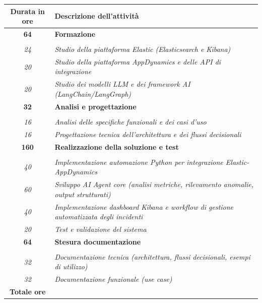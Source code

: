 

\begin{tabularx}{\textwidth}{|c|X|}
	\hline
	\textbf{Durata in ore} & \textbf{Descrizione dell'attività} \\\hline

	\textbf{64} & \textbf{Formazione} \\ \hdashline
    \multirow{3}{0cm}\\
    \textit{24} & \textit{Studio della piattaforma Elastic (Elasticsearch e Kibana)} \\
    \textit{20} & \textit{Studio della piattaforma AppDynamics e delle API di integrazione} \\
    \textit{20} & \textit{Studio dei modelli LLM e dei framework AI (LangChain/LangGraph)} \\
    \hline

    \textbf{32} & \textbf{Analisi e progettazione} \\ \hdashline
    \multirow{2}{0cm}\\
    \textit{16} & \textit{Analisi delle specifiche funzionali e dei casi d'uso} \\
    \textit{16} & \textit{Progettazione tecnica dell'architettura e dei flussi decisionali} \\
    \hline

    \textbf{160} & \textbf{Realizzazione della soluzione e test} \\ \hdashline
    \multirow{4}{0cm}\\
    \textit{40} & \textit{Implementazione automazione Python per integrazione Elastic-AppDynamics} \\
    \textit{60} & \textit{Sviluppo AI Agent core (analisi metriche, rilevamento anomalie, output strutturati)} \\
    \textit{40} & \textit{Implementazione dashboard Kibana e workflow di gestione automatizzata degli incidenti} \\
    \textit{20} & \textit{Test e validazione del sistema} \\
    \hline

    \textbf{64} & \textbf{Stesura documentazione} \\ \hdashline
    \multirow{2}{0cm}\\
    \textit{32} & \textit{Documentazione tecnica (architettura, flussi decisionali, esempi di utilizzo)} \\
    \textit{32} & \textit{Documentazione funzionale (use case)} \\
    \hline

	\textbf{Totale ore} & \multicolumn{1}{|c|}{\textbf{\totaleOre}} \\\hline


\end{tabularx}